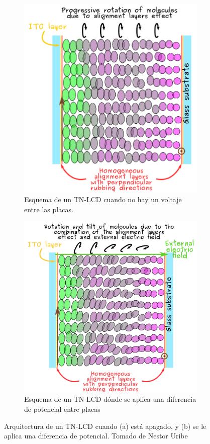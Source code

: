 \begin{figure}
\centering
\begin{subfigure}{.45\textwidth}
  \centering
  \includegraphics[width=.8\linewidth]{tn-lcd}
  \caption{Esquema de un TN-LCD cuando no hay un voltaje entre las placas.}
  \label{fig:tn-lc}
\end{subfigure}\qquad
\begin{subfigure}{.45\textwidth}
  \centering
  \includegraphics[width=.8\linewidth]{tn-lcd-voltage}
  \caption{Esquema de un TN-LCD dónde se aplica una diferencia de
    potencial entre placas}
  \label{fig:tn-lc-voltage}
\end{subfigure}
\caption[Arquitectura de un TN-LCD]{Arquitectura de un TN-LCD cuando (a) está apagado, y (b) se
  le aplica una diferencia de potencial. Tomado de Nestor Uribe }
  \label{fig:tn-lcd}
\end{figure} 

